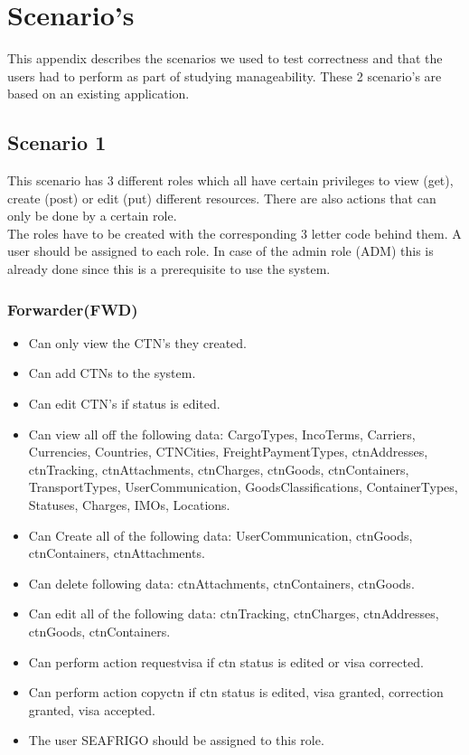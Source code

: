 \chapter{Scenario's}
\label{appendix:scenario}
This appendix describes the scenarios we used to test correctness and that the users had to perform as part of studying manageability.
These 2 scenario's are based on an existing application.

\section{Scenario 1}
This scenario has 3 different roles which all have certain privileges to view (get), create (post) or edit (put) different resources. There are also actions that can only be done by a certain role. 
\\
The roles have to be created with the corresponding 3 letter code behind them. A user should be assigned to each role. In case of the admin role (ADM) this is already done since this is a prerequisite to use the system.

\subsection{Forwarder(FWD)}
\begin{itemize}
    \item Can only view the CTN's they created.
    \item Can add CTNs to the system.
    \item Can edit CTN's if status is edited.
    \item Can view all off the following data: CargoTypes, IncoTerms, Carriers, Currencies, Countries, CTNCities, FreightPaymentTypes, ctnAddresses, ctnTracking, ctnAttachments, ctnCharges, ctnGoods, ctnContainers, TransportTypes, UserCommunication, GoodsClassifications, ContainerTypes, Statuses, Charges, IMOs, Locations.
    \item Can Create all of the following data: UserCommunication, ctnGoods, ctnContainers, ctnAttachments.
    \item Can delete following data: ctnAttachments, ctnContainers, ctnGoods.
    \item Can edit all of the following data: ctnTracking, ctnCharges, ctnAddresses, ctnGoods, ctnContainers. 
    \item Can perform action requestvisa if ctn status is edited or visa corrected.
    \item Can perform action copyctn if ctn status is edited, visa granted, correction granted, visa accepted.
    \item The user SEAFRIGO should be assigned to this role.
\end{itemize}

